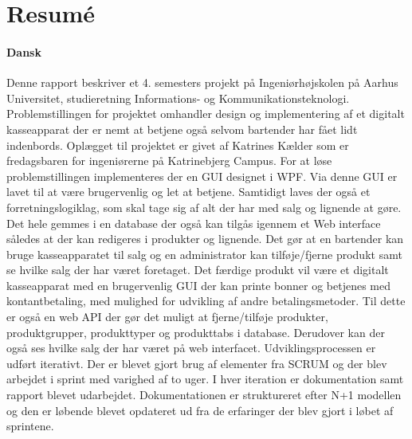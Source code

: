 \chapter{Resumé}
\subsubsection*{Dansk}

Denne rapport beskriver et 4. semesters projekt på Ingeniørhøjskolen på Aarhus Universitet, studieretning Informations- og Kommunikationsteknologi. 
Problemstillingen for projektet omhandler design og implementering af et digitalt kasseapparat der er nemt at betjene også selvom bartender har fået lidt indenbords. 
Oplægget til projektet er givet af Katrines Kælder som er fredagsbaren for ingeniørerne på Katrinebjerg Campus.
\newline
\newline
For at løse problemstillingen implementeres der en \gls{GUI} designet i \gls{WPF}. Via denne 
\gls{GUI} er lavet til at være brugervenlig og let at betjene. 
Samtidigt laves der også et forretningslogiklag, som skal tage sig af alt der har med salg og lignende at gøre. 
Det hele gemmes i en database der også kan tilgås igennem et Web interface således at der kan redigeres i produkter og lignende. 
Det gør at en bartender kan bruge kasseapparatet til salg og en administrator kan tilføje/fjerne produkt samt se hvilke salg der har været foretaget.
\newline
\newline
Det færdige produkt vil være et digitalt kasseapparat med en brugervenlig \gls{GUI} 
der kan printe bonner og betjenes med kontantbetaling, med mulighed for udvikling af andre betalingsmetoder. 
Til dette er også en web API der gør det muligt at fjerne/tilføje produkter, produktgrupper, produkttyper og produkttabs i database. 
Derudover kan der også ses hvilke salg der har været på web interfacet.
\newline
\newline
Udviklingsprocessen er udført iterativt. 
Der er blevet gjort brug af elementer fra SCRUM og der blev arbejdet i sprint med varighed af to uger. 
I hver iteration er dokumentation samt rapport blevet udarbejdet. 
Dokumentationen er struktureret efter N+1 modellen og den er løbende blevet opdateret ud fra de erfaringer der blev gjort i løbet af sprintene.   
\newline
\newline
















